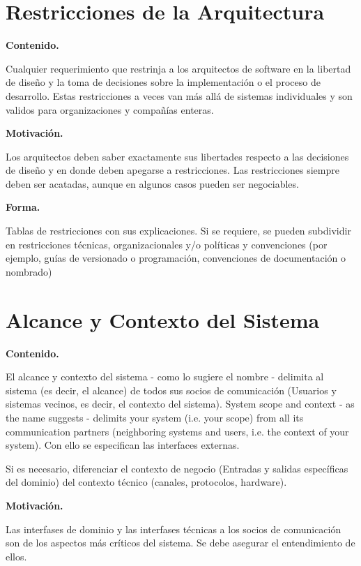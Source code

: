 \documentclass[]{article}
\begin{document}
\hypertarget{section-architecture-constraints}{%
\section{Restricciones de la
Arquitectura}\label{section-architecture-constraints}}

\textbf{Contenido.}

Cualquier requerimiento que restrinja a los arquitectos de software en
la libertad de diseño y la toma de decisiones sobre la implementación o
el proceso de desarrollo. Estas restricciones a veces van más allá de
sistemas individuales y son validos para organizaciones y compañías
enteras.

\textbf{Motivación.}

Los arquitectos deben saber exactamente sus libertades respecto a las
decisiones de diseño y en donde deben apegarse a restricciones. Las
restricciones siempre deben ser acatadas, aunque en algunos casos pueden
ser negociables.

\textbf{Forma.}

Tablas de restricciones con sus explicaciones. Si se requiere, se pueden
subdividir en restricciones técnicas, organizacionales y/o políticas y
convenciones (por ejemplo, guías de versionado o programación,
convenciones de documentación o nombrado)

\hypertarget{section-system-scope-and-context}{%
\section{Alcance y Contexto del
Sistema}\label{section-system-scope-and-context}}

\textbf{Contenido.}

El alcance y contexto del sistema - como lo sugiere el nombre - delimita
al sistema (es decir, el alcance) de todos sus socios de comunicación
(Usuarios y sistemas vecinos, es decir, el contexto del sistema). System
scope and context - as the name suggests - delimits your system (i.e.
your scope) from all its communication partners (neighboring systems and
users, i.e. the context of your system). Con ello se especifican las
interfaces externas.

Si es necesario, diferenciar el contexto de negocio (Entradas y salidas
específicas del dominio) del contexto técnico (canales, protocolos,
hardware).

\textbf{Motivación.}

Las interfases de dominio y las interfases técnicas a los socios de
comunicación son de los aspectos más críticos del sistema. Se debe
asegurar el entendimiento de ellos.
\end{document}
